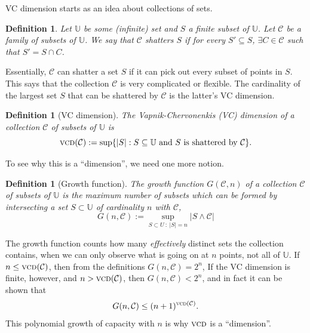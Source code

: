 \documentclass[12pt, oneside, a4paper]{article}
\theoremstyle{plain}
\newtheorem{definition}[theorem]{Definition}
\DeclareMathOperator*{\vcd}{\textsc{vcd}}
\theoremstyle{definition}
\begin{document}
VC dimension starts as an idea about collections of sets.
\begin{definition}
  Let $\mathbb{U}$ be some (infinite) set and $S$ a finite subset of
  $\mathbb{U}$. Let $\mathcal{C}$ be a family of subsets of $\mathbb{U}$. We
  say that $\mathcal{C}$ \emph{shatters} $S$ if for every $S' \subseteq S$,
  $\exists C \in\mathcal{C}$ such that $S' = S \cap C$.
\end{definition}
Essentially, $\mathcal{C}$ can shatter a set $S$ if it can pick out every
subset of points in $S$. This says that the collection $\mathcal{C}$ is very
complicated or flexible. The cardinality of the largest set $S$ that can be
shattered by $\mathcal{C}$ is the latter's VC dimension.
\begin{definition}
  [VC dimension]
  The \emph{Vapnik-Chervonenkis (VC) dimension} of a collection
  $\mathcal{C}$ of subsets of $\mathbb{U}$ is
  \begin{equation}
    \vcd(\mathcal{C}) := \sup \{ |S| : S\subseteq \mathbb{U}\mbox{ and
      $S$ is shattered by
    } \mathcal{C} \}.
  \end{equation}
\end{definition}
To see why this is a ``dimension'', we need one more notion.
\begin{definition}
  [Growth function] The \emph{growth function} $G(\mathcal{C},n)$ of a
  collection $\mathcal{C}$ of subsets of $\mathbb{U}$ is the maximum
  number of
  subsets which can be formed by intersecting a set $S \subset \mathbb{U}$ of
  cardinality $n$ with $\mathcal{C}$,
  \begin{equation}
    G(n,\mathcal{C}) := \sup_{S\subset U~:~ |S|=n}{|S\wedge \mathcal{C}|}
  \end{equation}
\end{definition}
The growth function counts how many {\em effectively} distinct sets the
collection contains, when we can only observe what is going on at $n$ points,
not all of $\mathbb{U}$.  If $n \leq \vcd(\mathcal{C})$, then from the definitions
$G(n,\mathcal{C}) = 2^n$, If the VC dimension is finite, however, and $n >
\vcd(\mathcal{C})$, then $G(n,\mathcal{C}) < 2^n$, and in fact it can be shown
\cite{VapnikChervonenkis1971} that
\begin{equation}
  G(n,\mathcal{C}) \leq
  (n+1)^{\vcd(\mathcal{C})}.
\end{equation}
This polynomial
growth of capacity with $n$ is why $\vcd$ is a ``dimension''.  
\end{document}
